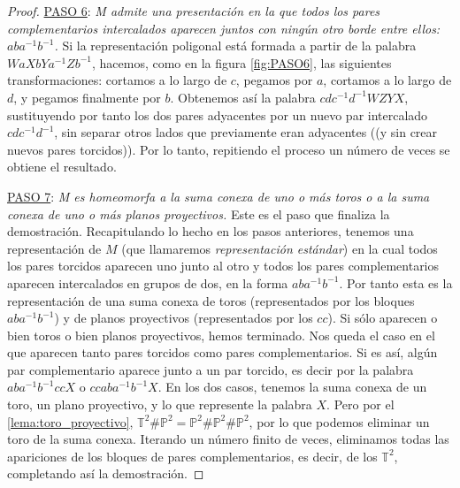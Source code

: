 \documentclass[10pt]{report}
\newcommand{\Toro}{\mathbb{T}^2}
\newcommand{\Proyectivo}{\mathbb{P}^2}
\theoremstyle{definition}
\begin{document}
\begin{proof}
\underline{PASO 6}: \textit{M admite una presentación en la que todos los pares complementarios intercalados aparecen juntos con ningún otro borde entre ellos: $aba^{-1}b^{-1}$.} Si la representación poligonal está formada a partir de la palabra $WaXbYa^{-1}Zb^{-1}$, hacemos, como en la figura \autoref{fig:PASO6}, las siguientes transformaciones: cortamos a lo largo de $c$, pegamos por $a$, cortamos a lo largo de $d$, y pegamos finalmente por $b$. Obtenemos así la palabra $cdc^{-1}d^{-1}WZYX$, sustituyendo por tanto los dos pares adyacentes por un nuevo par intercalado $cdc^{-1}d^{-1}$, sin separar otros lados que previamente eran adyacentes ((y sin crear nuevos pares torcidos)). Por lo tanto, repitiendo el proceso un número de veces se obtiene el resultado.

\underline{PASO 7}: \textit{M es homeomorfa a la suma conexa de uno o más toros o a la suma conexa de uno o más planos proyectivos.} Este es el paso que finaliza la demostración.  Recapitulando lo hecho en los pasos anteriores, tenemos una representación de $M$ (que llamaremos \textit{representación estándar}) en la cual todos los pares torcidos aparecen uno junto al otro y todos los pares complementarios aparecen intercalados en grupos de dos, en la forma $aba^{-1}b^{-1}$. Por tanto esta es la representación de una suma conexa de toros (representados por los bloques $aba^{-1}b^{-1}$) y de planos proyectivos (representados por los $cc$). Si sólo aparecen o bien toros o bien planos proyectivos, hemos terminado.
Nos queda el caso en el que aparecen tanto pares torcidos como pares complementarios. Si es así, algún par complementario aparece junto a un par torcido, es decir por la palabra $aba^{-1}b^{-1}ccX$ o $ccaba^{-1}b^{-1}X$. En los dos casos, tenemos la suma conexa de un toro, un plano proyectivo, y lo que represente la palabra $X$. Pero por el \autoref{lema:toro_proyectivo}, $\Toro \# \Proyectivo = \Proyectivo \# \Proyectivo \# \Proyectivo$, por lo que podemos eliminar un toro de la suma conexa. Iterando un número finito de veces, eliminamos todas las apariciones de los bloques de pares complementarios, es decir, de los $\Toro$, completando así la demostración.
\end{proof}
\end{document}
